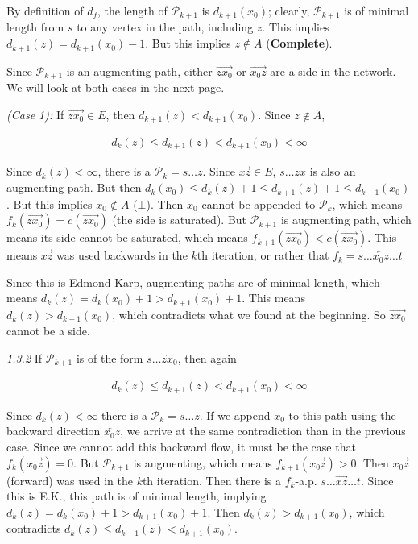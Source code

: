 \documentclass[a4paper, 12pt]{article}
\begin{document}
By definition of $d_f$, the length of $\mathcal{P}_{k+1}$ is $d_{k+1}(x_0)$;
clearly, $\mathcal{P}_{k+1}$ is of minimal length from $s$ to any vertex in
the path, including $z$. This implies $d_{k+1}(z) = d_{k+1}(x_0) - 1$. But
this implies $z \not\in A$ (\textbf{Complete}).

Since $\mathcal{P}_{k+1}$ is an augmenting path, either
$\overrightarrow{zx_0}$ or $\overrightarrow{x_0z}$ are a side in the network.
We will look at both cases in the next page.

\pagebreak 

\textit{(Case 1):} If $\overrightarrow{zx_0} \in E$, then
$d_{k+1}(z) < d_{k+1}(x_0)$. Since $z \not\in A$,

\begin{align*}
    d_k(z) \leq d_{k+1}(z) < d_{k+1}(x_0) < \infty
\end{align*}

Since $d_k(z) < \infty$, there is a $\mathcal{P}_k = s \ldots z$. Since
$\overrightarrow{xz} \in E$, $s \ldots z x$ is also an augmenting path. But
then $d_k(x_0) \leq d_k(z) + 1 \leq d_{k+1}(z) + 1 \leq d_{k+1}(x_0)$. But
this implies $x_0 \not\in A$ ($\bot$). Then $x_0$ cannot be appended to
$\mathcal{P}_k$, which means $f_k(\overrightarrow{zx_0}) =
c(\overrightarrow{zx_0})$ (the side is saturated). But $\mathcal{P}_{k+1}$ is
augmenting path, which means its side cannot be saturated, which means
$f_{k+1}(\overrightarrow{zx_0}) < c(\overrightarrow{zx_0})$. This means
$\overrightarrow{xz}$ was used backwards in the $k$th iteration, or rather
that $f_k = s \ldots \overleftarrow{x_0z} \ldots t$

Since this is Edmond-Karp, augmenting paths are of minimal length,
which means $d_k(z) = d_k(x_0) + 1 > d_{k+1}(x_0) + 1$. This means 
$d_k(z) > d_{k+1}(x_0)$, which contradicts what we found at the 
beginning. So $\overrightarrow{zx_0}$ cannot 
be a side.

\textit{1.3.2} If  $\mathcal{P}_{k+1}$
is of the form $s \ldots \overleftarrow{zx_0}$,
then again

\begin{align*}
    d_k(z) \leq d_{k+1}(z) < d_{k+1}(x_0) < \infty
\end{align*}

Since $d_k(z) < \infty$ there is a $\mathcal{P}_k = s \ldots z$. If we append
$x_0$ to this path using the backward direction $\overleftarrow{x_0z}$, we
arrive at the same contradiction than in the previous case. Since we cannot
add this backward flow, it must be the case that $f_k(\overrightarrow{x_0z})
= 0$. But $\mathcal{P}_{k+1}$ is augmenting, which means
$f_{k+1}(\overrightarrow{x_0z}) > 0$. Then $\overrightarrow{x_0z}$ (forward)
was used in the $k$th iteration. Then there is a $f_k$-a.p. $s \ldots
\overrightarrow{xz} \ldots t$. Since this is E.K., this path is of minimal
length, implying $d_k(z) = d_k(x_0) + 1 > d_{k+1}(x_0) + 1$. Then $d_k(z) >
d_{k+1}(x_0)$, which contradicts $d_k(z) \leq d_{k+1}(z) < d_{k+1}(x_0)$.
\end{document}
